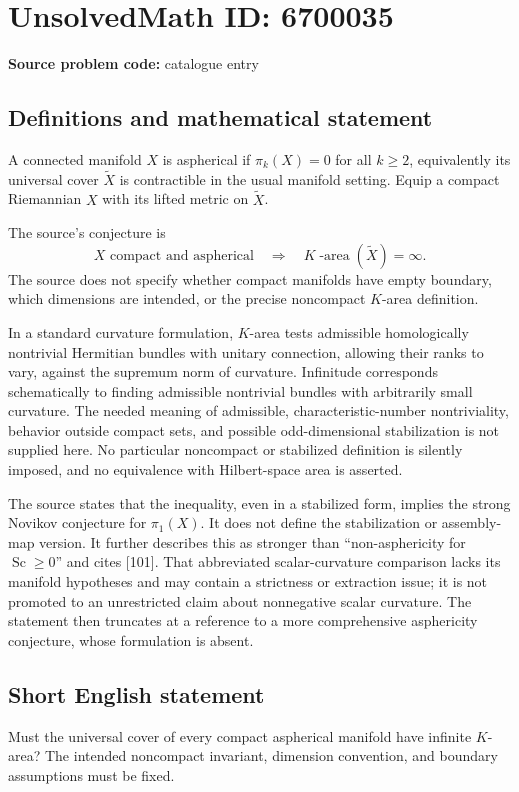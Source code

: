 \documentclass[11pt]{article}
\begin{document}
\section*{UnsolvedMath ID: 6700035}
\textbf{Source problem code:} catalogue entry
\subsection{Definitions and mathematical statement}
A connected manifold $X$ is aspherical if $\pi_k(X)=0$ for all $k\ge2$, equivalently its universal cover $\widetilde X$ is contractible in the usual manifold setting. Equip a compact Riemannian $X$ with its lifted metric on $\widetilde X$.

The source's conjecture is
\[
 X\text{ compact and aspherical}\quad\Longrightarrow\quad
       K\operatorname{-area}(\widetilde X)=\infty.
\]
The source does not specify whether compact manifolds have empty boundary, which dimensions are intended, or the precise noncompact $K$-area definition.

In a standard curvature formulation, $K$-area tests admissible homologically nontrivial Hermitian bundles with unitary connection, allowing their ranks to vary, against the supremum norm of curvature. Infinitude corresponds schematically to finding admissible nontrivial bundles with arbitrarily small curvature. The needed meaning of admissible, characteristic-number nontriviality, behavior outside compact sets, and possible odd-dimensional stabilization is not supplied here. No particular noncompact or stabilized definition is silently imposed, and no equivalence with Hilbert-space area is asserted.

The source states that the inequality, even in a stabilized form, implies the strong Novikov conjecture for $\pi_1(X)$. It does not define the stabilization or assembly-map version. It further describes this as stronger than ``non-asphericity for $\operatorname{Sc}\ge0$'' and cites [101]. That abbreviated scalar-curvature comparison lacks its manifold hypotheses and may contain a strictness or extraction issue; it is not promoted to an unrestricted claim about nonnegative scalar curvature. The statement then truncates at a reference to a more comprehensive asphericity conjecture, whose formulation is absent.
\subsection{Short English statement}
Must the universal cover of every compact aspherical manifold have infinite $K$-area? The intended noncompact invariant, dimension convention, and boundary assumptions must be fixed.
\end{document}

